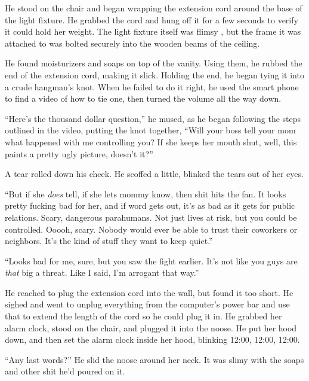 He stood on the chair and began wrapping the extension cord around the base of the light fixture.  He grabbed the cord and hung off it for a few seconds to verify it could hold her weight.  The light fixture itself was flimsy , but the frame it was attached to was bolted securely into the wooden beams of the ceiling.



He found moisturizers and soaps on top of the vanity.  Using them, he rubbed the end of the extension cord, making it slick.  Holding the end, he began tying it into a crude hangman's knot.  When he failed to do it right, he used the smart phone to find a video of how to tie one, then turned the volume all the way down.



``Here's the thousand dollar question,'' he mused, as he began following the steps outlined in the video, putting the knot together, ``Will your boss tell your mom what happened with me controlling you?  If she keeps her mouth shut, well, this paints a pretty ugly picture, doesn't it?''



A tear rolled down his cheek.  He scoffed a little, blinked the tears out of her eyes.



``But if she \emph{does} tell, if she lets mommy know, then shit hits the fan.  It looks pretty fucking bad for her, and if word gets out, it's as bad as it gets for public relations.  Scary, dangerous parahumans.  Not just lives at risk, but you could be controlled.  Ooooh, scary.  Nobody would ever be able to trust their coworkers or neighbors.  It's the kind of stuff they want to keep quiet.''



``Looks bad for me, sure, but you saw the fight earlier.  It's not like you guys are \emph{that} big a threat.  Like I said, I'm arrogant that way.''



He reached to plug the extension cord into the wall, but found it too short.  He sighed and went to unplug everything from the computer's power bar and use that to extend the length of the cord so he could plug it in.  He grabbed her alarm clock, stood on the chair, and plugged it into the noose.  He put her hood down, and then set the alarm clock inside her hood, blinking 12:00, 12:00, 12:00.



``Any last words?''  He slid the noose around her neck.  It was slimy with the soaps and other shit he'd poured on it.



